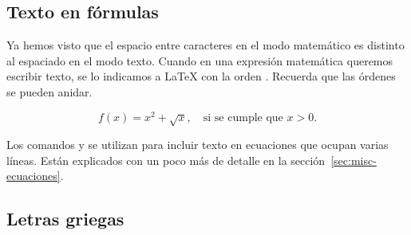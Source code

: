 \documentclass{article}
\numberwithin{equation}{section}
\theoremstyle{plain}
\theoremstyle{definition}
\theoremstyle{remark}
\begin{document}
%
%
%

\subsection{Texto en fórmulas}


Ya hemos visto que el espacio entre caracteres en el modo matemático es distinto al espaciado en el modo texto. Cuando en una expresión matemática queremos escribir texto, se lo indicamos a \LaTeX{} con la orden \texttt{}. Recuerda que las órdenes se pueden anidar.
\begin{codigo-arriba}
	\[ 
	f(x)=x^2 + \sqrt{x}, \quad \text{si se cumple que $x>0$.}
	\]
\end{codigo-arriba}
Los comandos \texttt{} y \texttt{} se utilizan para incluir texto en ecuaciones que ocupan varias líneas. Están explicados con un poco más de detalle en la sección~\ref{sec:misc-ecuaciones}.

\subsection{Letras griegas}    
\end{document}
